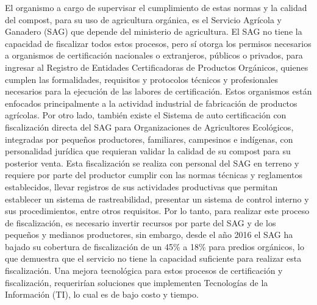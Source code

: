 \documentclass[12pt, letterpaper]{article}
\begin{document}
El organismo a cargo de supervisar el cumplimiento de estas normas y la calidad del compost, para su uso de agricultura orgánica, es el Servicio Agrícola y Ganadero (SAG) que depende del ministerio de agricultura. El SAG no tiene la capacidad de fiscalizar todos estos procesos, pero sí otorga los permisos necesarios a organismos de certificación nacionales o extranjeros, públicos o privados, para ingresar al Registro de Entidades Certificadoras de Productos Orgánicos, quienes cumplen las formalidades, requisitos y protocolos técnicos y profesionales necesarios para la ejecución de las labores de certificación. Estos organismos están enfocados principalmente a la actividad industrial de fabricación de productos agrícolas. Por otro lado, también existe el Sistema de auto certificación con fiscalización directa del SAG para Organizaciones de Agricultores Ecológicos, integradas por pequeños productores, familiares, campesinos e indígenas, con personalidad jurídica que requieran validar la calidad de su compost para su posterior venta. Esta fiscalización se realiza con personal del SAG en terreno y requiere por parte del productor cumplir con las normas técnicas y reglamentos establecidos, llevar registros de sus actividades productivas que permitan establecer un sistema de rastreabilidad, presentar un sistema de control interno y sus procedimientos, entre otros requisitos. Por lo tanto, para realizar este proceso de fiscalización, es necesario invertir recursos por parte del SAG y de los pequeños y medianos productores, sin embargo, desde el año 2016 el SAG ha bajado su cobertura de fiscalización de un 45\% a 18\% para predios orgánicos, lo que demuestra que el servicio no tiene la capacidad suficiente para realizar esta fiscalización. Una mejora tecnológica para estos procesos de certificación y fiscalización, requerirían soluciones que implementen Tecnologías de la Información (TI), lo cual es de bajo costo y tiempo.
\end{document}
